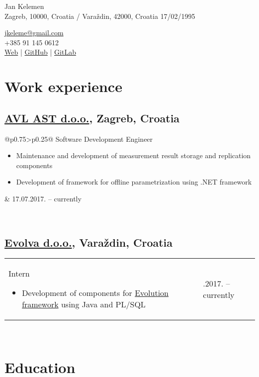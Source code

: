 \documentclass[a4paper]{article}
\makeatletter
\newlength{\tablewidth}
\newenvironment{period}[2]{%
\newcommand{\sarma}{#2}%
\setlength{\tablewidth}{\linewidth}
\addtolength{\tablewidth}{-2\tabcolsep}
\begin{tabular}{@{}p{0.75\tablewidth}>{\raggedleft\arraybackslash}p{0.25\tablewidth}@{}}%
#1 \newline
\begin{itemize}
}{%
\end{itemize} & \sarma \\%
\end{tabular}\\
}
\makeatother
\begin{document}
\fontfamily{\sfdefault}
\selectfont

\begin{minipage}{.5\textwidth}
\LARGE{Jan Kelemen}\\
\normalsize{Zagreb, 10000, Croatia / Vara\v{z}din, 42000, Croatia}
\normalsize{17/02/1995}
\end{minipage}%
\begin{minipage}{.5\textwidth}
\raggedleft
\href{mailto:jkeleme@gmail.com}{jkeleme@gmail.com} \\
+385 91 145 0612 \\
\href{http://jan-kelemen.github.io/}{Web} | \href{https://github.com/jan-kelemen}{GitHub} | \href{https://gitlab.com/jan-kelemen}{GitLab}
\end{minipage}

\vspace{1em}

\section{Work experience}
\subsection{\href{https://www.avl.com/}{AVL AST d.o.o.}, Zagreb, Croatia}
\begin{period}{Software Development Engineer}{17.07.2017. -- currently}
        \item
                Maintenance and development of measurement result storage and replication components
	\item
		Development of framework for offline parametrization using .NET framework
\end{period}
\subsection{\href{http://www.evolva.hr/hr/index.html}{Evolva d.o.o.}, Vara\v{z}din, Croatia}
\begin{period}{Intern}{22.08.2016. -- 23.09.2016.}
	\item
		Development of components for \href{http://www.evolution-framework.com/}{Evolution framework} using Java and PL/SQL
\end{period}

\section{Education}
\end{document}
